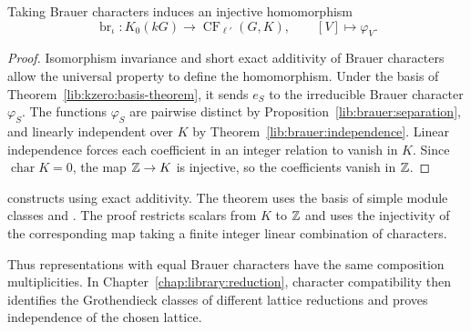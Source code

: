 \begin{proposition}
\label{lib:kzero:brauer-injective}
Taking Brauer characters induces an injective homomorphism
\[
 \operatorname{br}_{\iota}:K_0(kG)\longrightarrow
 \operatorname{CF}_{\ell'}(G,K),
 \qquad [V]\longmapsto\varphi_V.
\]
\end{proposition}
\begin{proof}
Isomorphism invariance and short exact additivity of Brauer characters
allow the universal property to define the homomorphism. Under the basis
of Theorem~\ref{lib:kzero:basis-theorem}, it sends $e_S$ to the irreducible
Brauer character $\varphi_S$. The functions $\varphi_S$ are pairwise distinct by
Proposition~\ref{lib:brauer:separation}, and linearly independent over
$K$ by Theorem~\ref{lib:brauer:independence}. Linear independence forces
each coefficient in an integer relation to vanish in $K$. Since
$\operatorname{char}K=0$, the map $\mathbb Z\to K$ is injective, so the
coefficients vanish in $\mathbb Z$.
\end{proof}

\begin{implementation}
 constructs
 using exact
additivity. The theorem 
uses the basis of simple module classes and
.
The proof restricts scalars from $K$ to $\mathbb Z$ and uses the injectivity of
the corresponding map taking a finite integer linear combination of characters.
\end{implementation}

Thus representations with equal Brauer characters have the same
composition multiplicities. In Chapter~\ref{chap:library:reduction},
character compatibility then identifies the Grothendieck classes of
different lattice reductions and proves independence of the chosen lattice.
